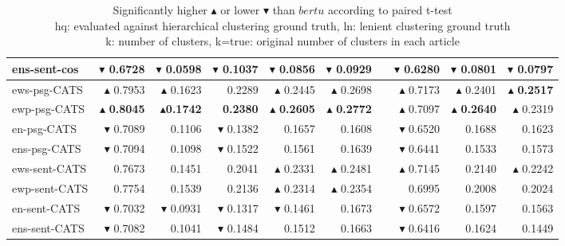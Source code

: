 \documentclass[sigconf,authordraft]{acmart}
\begin{document}
\begin{table}[t]
\begin{tabular}{@{}lrrrrrrrrr@{}}
ens-sent-cos & $\blacktriangledown$ 0.6728 & $\blacktriangledown$ 0.0598 & $\blacktriangledown$ 0.1037 & $\blacktriangledown$ 0.0856 & $\blacktriangledown$ 0.0929 && $\blacktriangledown$ 0.6280 & $\blacktriangledown$ 0.0801 & $\blacktriangledown$ 0.0797 \\\midrule
ews-psg-CATS & $\blacktriangle$ 0.7953 & $\blacktriangle$ 0.1623 & 0.2289 & $\blacktriangle$ 0.2445 & $\blacktriangle$ 0.2698 && $\blacktriangle$ 0.7173 & $\blacktriangle$ 0.2401 & $\blacktriangle$ \textbf{0.2517} \\ 
ewp-psg-CATS & $\blacktriangle$ \textbf{0.8045} & $\blacktriangle$\textbf{0.1742} & \textbf{0.2380} & $\blacktriangle$ \textbf{0.2605} & $\blacktriangle$ \textbf{0.2772} && $\blacktriangle$ 0.7097 & $\blacktriangle$ \textbf{0.2640} & $\blacktriangle$ 0.2319 \\ 
en-psg-CATS & $\blacktriangledown$ 0.7089 & 0.1106 & $\blacktriangledown$ 0.1382 & 0.1657 & 0.1608 && $\blacktriangledown$ 0.6520 & 0.1688 & 0.1623 \\ 
ens-psg-CATS & $\blacktriangledown$ 0.7094 & 0.1098 & $\blacktriangledown$ 0.1522 & 0.1561 & 0.1639 && $\blacktriangledown$ 0.6441 & 0.1533 & 0.1573 \\\midrule
ews-sent-CATS & 0.7673 & 0.1451 & 0.2041 & $\blacktriangle$ 0.2331 & $\blacktriangle$ 0.2481 && $\blacktriangle$ 0.7145 & 0.2140 & $\blacktriangle$ 0.2242 \\ 
ewp-sent-CATS & 0.7754 & 0.1539 & 0.2136 & $\blacktriangle$ 0.2314 & $\blacktriangle$ 0.2354 && 0.6995 & 0.2008 & 0.2024 \\ 
en-sent-CATS & $\blacktriangledown$ 0.7032 & $\blacktriangledown$ 0.0931 & $\blacktriangledown$ 0.1317 & $\blacktriangledown$ 0.1461 & 0.1673 && $\blacktriangledown$ 0.6572 & 0.1597 & 0.1563 \\ 
ens-sent-CATS & $\blacktriangledown$ 0.7082 & 0.1041 & $\blacktriangledown$ 0.1484 & 0.1512 & 0.1663 && $\blacktriangledown$ 0.6416 & 0.1624 & 0.1449 \\ 
\bottomrule
\end{tabular}
\caption*{Significantly higher $\blacktriangle$ or lower $\blacktriangledown$ than $bertu$ according to paired t-test \\
hq: evaluated against hierarchical clustering ground truth, ln: lenient clustering ground truth\\
k: number of clusters, k=true: original number of clusters in each article}
\end{table}
\end{document}
